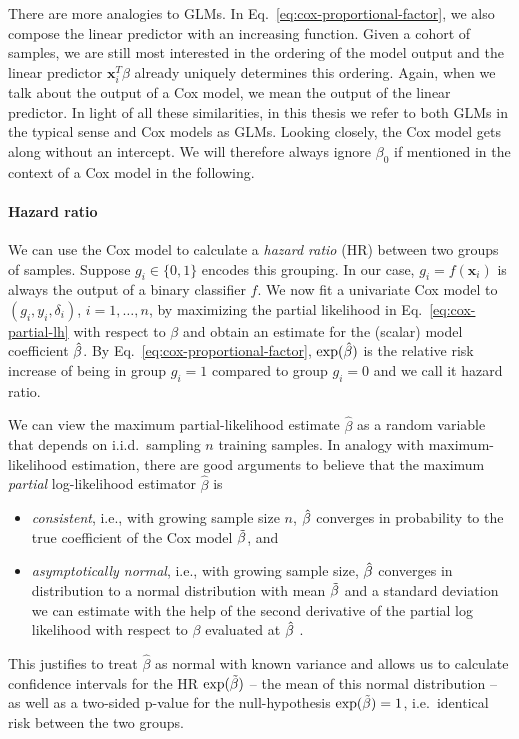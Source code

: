 There are more analogies to GLMs. In Eq.\ \eqref{eq:cox-proportional-factor}, we also compose the 
linear predictor with an increasing function. Given a cohort of samples, we are still most 
interested in the ordering of the model output and the linear predictor $\mathbf{x}_i^T \beta$ 
already uniquely determines this ordering. Again, when we talk about the output of a Cox model, we 
mean the output of the linear predictor. In light of all these similarities,
in this thesis we refer to both GLMs in the typical sense and Cox models as GLMs. Looking closely,
the Cox model gets along without an intercept. We will therefore always ignore $\beta_0$ if 
mentioned in the context of a Cox model in the following.

\paragraph{Hazard ratio}

We can use the Cox model to calculate a \textit{hazard ratio} (HR) between two groups of samples. 
Suppose $g_i \in \{0, 1\}$ encodes this grouping. In our case, $g_i = f(\mathbf{x}_i)$ is always 
the output of a binary classifier $f$. We now fit a univariate Cox model to $(g_i, y_i, \delta_i)$, 
$i = 1, \ldots, n$, by maximizing 
the partial likelihood in Eq.\ \eqref{eq:cox-partial-lh} with respect to $\beta$ and obtain an estimate
for the (scalar) model coefficient $\hat{\beta}$. By Eq.\ \eqref{eq:cox-proportional-factor}, 
$\exp(\hat{\beta})$ is the relative risk increase of being in group $g_i = 1$ compared to group 
$g_i = 0$ and we call it hazard ratio.

We can view the maximum partial-likelihood estimate $\hat{\beta}$ as a random variable that depends 
on i.i.d.\ sampling $n$ training samples. In analogy with maximum-likelihood estimation, there are 
good arguments to believe that the maximum \textit{partial} log-likelihood estimator $\hat{\beta}$
is
\begin{itemize}  
    \item \textit{consistent}, i.e., with growing sample size $n$, $\hat{\beta}$ converges in 
        probability to the true coefficient of the Cox model $\tilde{\beta}$, and
    \item \textit{asymptotically normal}, i.e., with growing sample size, $\hat{\beta}$ converges 
        in distribution to a normal distribution with mean $\tilde{\beta}$ and a standard deviation we 
        can estimate with the help of the second derivative of the partial log likelihood with 
        respect to $\beta$ evaluated at $\hat{\beta}$ \cite[8.1--8.4]{klein03}.
\end{itemize}
This justifies to treat $\hat{\beta}$ as normal with known variance and allows us to
calculate confidence intervals for the HR $\exp(\tilde{\beta})$ -- the mean of this normal distribution -- 
as well as a two-sided p-value for the null-hypothesis $\exp(\tilde{\beta}) = 1$, i.e.\ identical risk 
between the two groups. 

